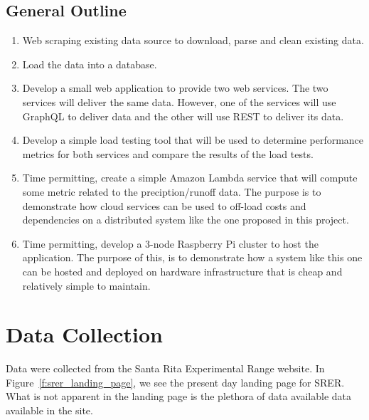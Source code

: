 \subsection{General Outline}

\begin{enumerate}
\item Web scraping existing data source to download, parse and clean
  existing data.
\item Load the data into a database.
\item Develop a small web application to provide two web services.
  The two services will deliver the same data.  However, one of the
  services will use GraphQL\cite{hid505FacebookGraphQL2018} to deliver
  data and the other will use REST\cite{hid505swaggerio2018} to
  deliver its data.
\item Develop a simple load testing tool that will be used to
  determine performance metrics for both services and compare the
  results of the load tests.
\item Time permitting, create a simple Amazon Lambda service that will
  compute some metric related to the preciption/runoff data.  The
  purpose is to demonstrate how cloud services can be used to off-load
  costs and dependencies on a distributed system like the one proposed
  in this project.
\item Time permitting, develop a 3-node Raspberry Pi cluster to host
  the application.  The purpose of this, is to demonstrate how a
  system like this one can be hosted and deployed on hardware
  infrastructure that is cheap and relatively simple to maintain.
\end{enumerate}

\section{Data Collection}

Data were collected from the Santa Rita Experimental Range website.  In 
Figure~\ref{f:srer_landing_page}, we see the present day landing 
page for SRER.  What is not apparent in the landing page is the 
plethora of data available data available in the site.

